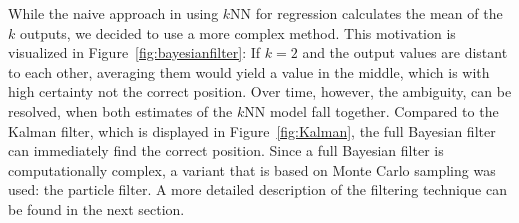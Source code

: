 While the naive approach in using $k$NN for regression calculates the mean of the $k$ outputs, we decided to use a more complex method. This motivation is visualized in Figure~\ref{fig:bayesianfilter}: If $k=2$ and the output values are distant to each other, averaging them would yield a value in the middle, which is with high certainty not the correct position. Over time, however, the ambiguity, can be resolved, when both estimates of the $k$NN model fall together. Compared to the Kalman filter, which is displayed in Figure~\ref{fig:Kalman}, the full Bayesian filter can immediately find the correct position. Since a full Bayesian filter is computationally complex, a variant that is based on Monte Carlo sampling was used: the particle filter. A more detailed description of the filtering technique can be found in the next section.  